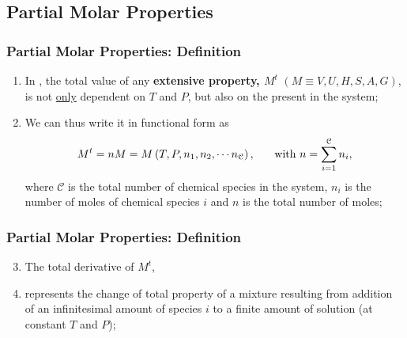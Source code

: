 \documentclass[10pt,compress,unknownkeysallowed]{beamer}
\begin{document}
\subsection{Partial Molar Properties}

\begin{frame}
  \frametitle{Partial Molar Properties: Definition}
  \begin{enumerate}%
    \item<1-> In , the total value of any {\bf extensive property, $M^{t}$} $\left(M\equiv V,U, H, S, A, G\right)$, is not \underline{only} dependent on $T$ and $P$, but also on the  present in the system;
    \item<2-> We can thus write it in functional form as
      \begin{displaymath}
        M^{t}=nM = M\left(T,P,n_{1}, n_{2}, \cdots n_{\mathcal{C}}\right), \hspace{.5cm} \text{ with } n = \summation[n_{i}]{i=1}{\mathcal{C}},
      \end{displaymath}
      where $\mathcal{C}$ is the total number of chemical species in the system, $n_{i}$ is the number of moles of chemical species $i$ and $n$ is the total number of moles;
  \end{enumerate} 
\end{frame}
\normalsize
\begin{frame}
  \frametitle{Partial Molar Properties: Definition}
  \begin{enumerate}\setcounter{enumi}{2}
    \item<1-> The total derivative of $M^{t}$,
    \item<2->  represents the change of total property  of a mixture resulting from addition of an infinitesimal amount of species $i$ to a finite amount of solution (at constant $T$ and $P$);
  \end{enumerate}
\end{frame}
\normalsize
\end{document}
